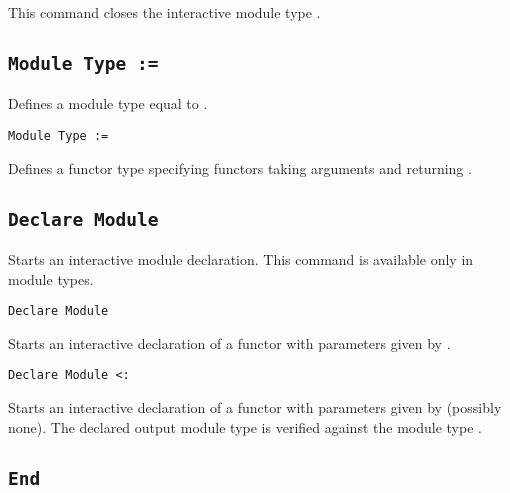 This command closes the interactive module type {\ident}.

\begin{ErrMsgs}
\item {}
\end{ErrMsgs}

\subsection{\tt Module Type {\ident} := {\modtype}}

Defines a module type {\ident} equal to {\modtype}.

\begin{Variants}
\item {\tt Module Type {\ident} {\modbindings} := {\modtype}}

  Defines a functor type {\ident} specifying functors taking arguments
  {\modbindings} and returning {\modtype}.
\end{Variants}

\subsection{\tt Declare Module {\ident}}

Starts an interactive module declaration. This command is available
only in module types. 

\begin{Variants}

\item{\tt Declare Module {\ident} {\modbindings}}

  Starts an interactive declaration of a functor with parameters given
  by {\modbindings}.

%

\item{\tt Declare Module {\ident} {\modbindings} \verb.<:. {\modtype}}

  Starts an interactive declaration of a functor with parameters given
  by {\modbindings} (possibly none). The declared output module type is
  verified against the module type {\modtype}.

\end{Variants}

\subsection{\tt End {\ident}}

